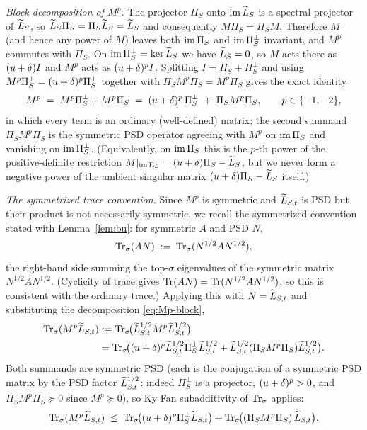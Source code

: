 \emph{Block decomposition of $M^p$.} The projector $\Pi_S$ onto $\operatorname{im}\widetilde{L}_S$
is a spectral projector of $\widetilde{L}_S$, so $\widetilde{L}_S\Pi_S=\Pi_S\widetilde{L}_S=\widetilde{L}_S$
and consequently $M\Pi_S=\Pi_S M$. Therefore $M$ (and hence any power of $M$)
leaves both $\operatorname{im}\Pi_S$ and $\operatorname{im}\Pi_S^\perp$ invariant, and $M^p$ commutes
with $\Pi_S$. On $\operatorname{im}\Pi_S^\perp=\ker\widetilde{L}_S$ we have $\widetilde{L}_S=0$, so $M$
acts there as $(u+\delta)I$ and $M^p$ acts as $(u+\delta)^pI$. Splitting
$I=\Pi_S+\Pi_S^\perp$ and using $M^p\Pi_S^\perp=(u+\delta)^p\Pi_S^\perp$ together
with $\Pi_S M^p\Pi_S=M^p\Pi_S$ gives the exact identity
\begin{equation}\label{eq:Mp-block}
  M^p \;=\; M^p\Pi_S^\perp + M^p\Pi_S
        \;=\; (u+\delta)^p\,\Pi_S^\perp \;+\; \Pi_S M^p\Pi_S,
  \qquad p\in\{-1,-2\},
\end{equation}
in which every term is an ordinary (well-defined) matrix; the second summand
$\Pi_S M^p\Pi_S$ is the symmetric PSD operator agreeing with $M^p$ on
$\operatorname{im}\Pi_S$ and vanishing on $\operatorname{im}\Pi_S^\perp$. (Equivalently, on
$\operatorname{im}\Pi_S$ this is the $p$-th power of the positive-definite restriction
$M|_{\operatorname{im}\Pi_S}=(u+\delta)\Pi_S-\widetilde{L}_S$, but we never form a negative power
of the ambient singular matrix $(u+\delta)\Pi_S-\widetilde{L}_S$ itself.)

\emph{The symmetrized trace convention.} Since $M^p$ is symmetric and
$\widetilde{L}_{S,t}$ is PSD but their product is not necessarily symmetric, we recall
the symmetrized convention stated with Lemma~\ref{lem:bu}: for symmetric $A$ and
PSD $N$,
\[
  \operatorname{Tr}_{\sigma}(AN) \;:=\; \operatorname{Tr}_{\sigma}(N^{1/2}AN^{1/2}),
\]
the right-hand side summing the top-$\sigma$ eigenvalues of the symmetric matrix
$N^{1/2}AN^{1/2}$.  (Cyclicity of trace gives $\operatorname{Tr}(AN)=\operatorname{Tr}(N^{1/2}AN^{1/2})$,
so this is consistent with the ordinary trace.)  Applying this with $N=\widetilde{L}_{S,t}$
and substituting the decomposition \eqref{eq:Mp-block},
\begin{align*}
\operatorname{Tr}_{\sigma}(M^p\widetilde{L}_{S,t})
  &:= \operatorname{Tr}_{\sigma}\!\bigl(\widetilde{L}_{S,t}^{1/2}M^p\widetilde{L}_{S,t}^{1/2}\bigr) \\
  &= \operatorname{Tr}_{\sigma}\!\bigl((u+\delta)^p\widetilde{L}_{S,t}^{1/2}\Pi_S^\perp\widetilde{L}_{S,t}^{1/2}
     + \widetilde{L}_{S,t}^{1/2}(\Pi_S M^p\Pi_S)\widetilde{L}_{S,t}^{1/2}\bigr).
\end{align*}
Both summands are symmetric PSD (each is the conjugation of a symmetric PSD matrix
by the PSD factor $\widetilde{L}_{S,t}^{1/2}$: indeed $\Pi_S^\perp$ is a projector,
$(u+\delta)^p>0$, and $\Pi_S M^p\Pi_S\succeq0$ since $M^p\succeq0$), so Ky Fan
subadditivity of $\operatorname{Tr}_{\sigma}$ \cite[Thm.~4.3.47a]{HJ12} applies:
\begin{equation}\label{eq:split}
  \operatorname{Tr}_{\sigma}(M^p\widetilde{L}_{S,t}) \;\le\;
  \operatorname{Tr}_{\sigma}\!\bigl((u+\delta)^p\Pi_S^\perp\widetilde{L}_{S,t}\bigr)
  + \operatorname{Tr}_{\sigma}\!\bigl((\Pi_S M^p\Pi_S)\,\widetilde{L}_{S,t}\bigr).
\end{equation}

